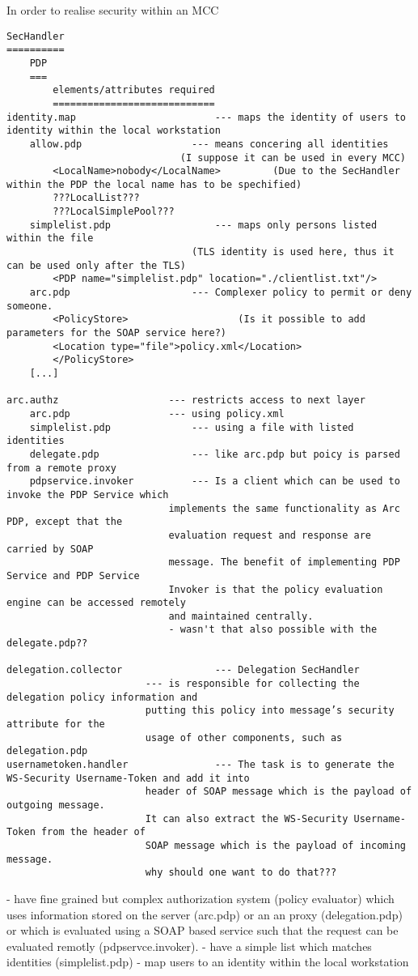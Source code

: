 In order to realise security within an MCC 
\begin{verbatim}
SecHandler 
==========
	PDP
	===	
		elements/attributes required
		============================
identity.map						--- maps the identity of users to identity within the local workstation
	allow.pdp					--- means concering all identities
							  (I suppose it can be used in every MCC)
		<LocalName>nobody</LocalName>		  (Due to the SecHandler within the PDP the local name has to be spechified)
		???LocalList???
		???LocalSimplePool???
	simplelist.pdp					--- maps only persons listed within the file
								(TLS identity is used here, thus it can be used only after the TLS)
		<PDP name="simplelist.pdp" location="./clientlist.txt"/>
	arc.pdp						--- Complexer policy to permit or deny someone. 
		<PolicyStore>					(Is it possible to add parameters for the SOAP service here?)
		<Location type="file">policy.xml</Location>
		</PolicyStore>
	[...]

arc.authz					--- restricts access to next layer
	arc.pdp					--- using policy.xml
	simplelist.pdp				--- using a file with listed identities
	delegate.pdp				--- like arc.pdp but poicy is parsed from a remote proxy
	pdpservice.invoker			--- Is a client which can be used to invoke the PDP Service which 
							implements the same functionality as Arc PDP, except that the
							evaluation request and response are carried by SOAP
							message. The benefit of implementing PDP Service and PDP Service 
							Invoker is that the policy evaluation engine can be accessed remotely
							and maintained centrally.
							- wasn't that also possible with the delegate.pdp??

delegation.collector 				--- Delegation SecHandler
						--- is responsible for collecting the delegation policy information and 
						putting this policy into message’s security attribute for the 
						usage of other components, such as delegation.pdp
usernametoken.handler				--- The task is to generate the WS-Security Username-Token and add it into
						header of SOAP message which is the payload of outgoing message. 
						It can also extract the WS-Security Username-Token from the header of 
						SOAP message which is the payload of incoming message.
						why should one want to do that???

\end{verbatim}



- have fine grained but complex authorization system (policy evaluator) which uses information stored on the server (arc.pdp) or an an proxy (delegation.pdp) or which is evaluated using a SOAP based service such that the request can be evaluated remotly (pdpservce.invoker). 
- have a simple list which matches identities (simplelist.pdp)
- map users to an identity within the local workstation


